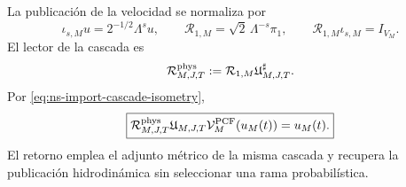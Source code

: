 La publicación de la velocidad se normaliza por
\begin{equation}
 \iota_{s,M}u=2^{-1/2}\Lambda^su,
 \qquad
 \mathcal R_{1,M}=\sqrt2\,\Lambda^{-s}\pi_1,
 \qquad
 \mathcal R_{1,M}\iota_{s,M}=I_{V_M}.
 \label{eq:ns-import-grade-one-return}
\end{equation}
El lector de la cascada es
\begin{equation}
 \mathcal R_{M,J,T}^{\rm phys}
 :=\mathcal R_{1,M}\mathfrak U_{M,J,T}^{\sharp}.
 \label{eq:ns-import-full-return}
\end{equation}
Por \eqref{eq:ns-import-cascade-isometry},
\begin{equation}
 \boxed{
 \mathcal R_{M,J,T}^{\rm phys}
 \mathfrak U_{M,J,T}\mathcal V_M^{\rm PCF}(u_M(t))
 =u_M(t).}
 \label{eq:ns-import-exact-return}
\end{equation}
El retorno emplea el adjunto métrico de la misma cascada y recupera la
publicación hidrodinámica sin seleccionar una rama probabilística.

